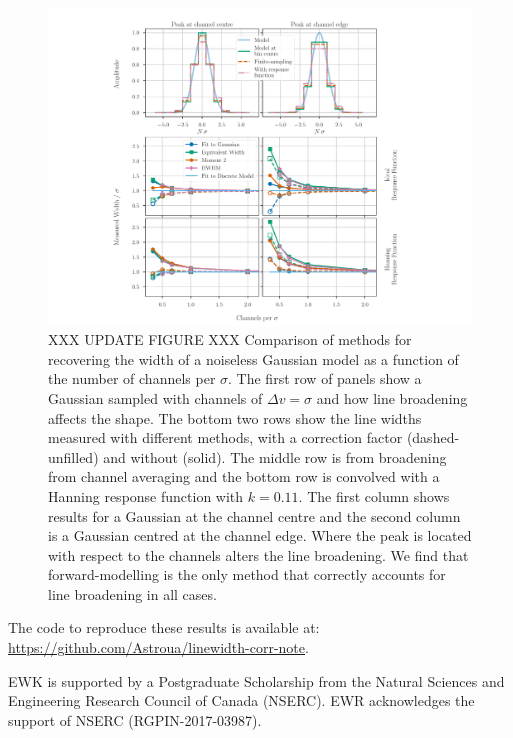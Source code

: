 \documentclass{rnaastex}
\begin{document}
\begin{figure}
\includegraphics[width=\textwidth]{combined_figure}
\caption{\label{fig:width_recovery_comparison} XXX UPDATE FIGURE XXX Comparison of methods for recovering the width of a noiseless Gaussian model as a function of the number of channels per $\sigma$. The first row of panels show a Gaussian sampled with channels of $\Delta v=\sigma$ and how line broadening affects the shape.  The bottom two rows show the line widths measured with different methods, with a correction factor (dashed-unfilled) and without (solid). The middle row is from broadening from channel averaging and the bottom row is convolved with a Hanning response function with $k=0.11$. The first column shows results for a Gaussian at the channel centre and the second column is a Gaussian centred at the channel edge.  Where the peak is located with respect to the channels alters the line broadening.  We find that forward-modelling is the only method that correctly accounts for line broadening in all cases.}
\end{figure}

The code to reproduce these results is available at: \url{https://github.com/Astroua/linewidth-corr-note}.

\acknowledgments

EWK is supported by a Postgraduate Scholarship from the Natural Sciences and Engineering Research Council of Canada (NSERC). EWR acknowledges the support of NSERC (RGPIN-2017-03987).

\end{document}
